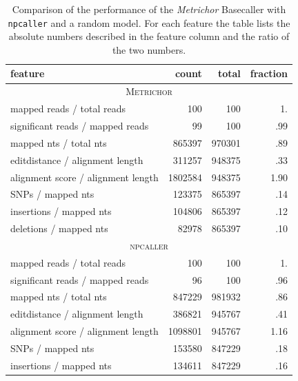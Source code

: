 \documentclass[]{scrartcl}
\begin{document}
\begin{table}[bp]
\centering
\caption{Comparison of the performance of the \textit{Metrichor} Basecaller with \texttt{npcaller} and a random model. For each feature the table lists the absolute numbers described in the feature column and the ratio of the two numbers. }
\label{tab:stats}
\small
\begin{tabular}{l|rrr}
\hline
\hline
\textbf{feature} & \textbf{count} & \textbf{total} & \textbf{fraction} \\\hline
\multicolumn{4}{c}{\textsc{Metrichor}}  \\
mapped reads / total reads 		&
100 	& 100 	& 1.	 \\

significant reads / mapped reads & 
99 & 100 & .99  \\

mapped nts / total nts &
865397 & 970301 & .89 \\

editdistance / alignment length & 
311257 & 948375 & .33  \\

alignment score / alignment length & 
1802584 & 948375 & 1.90  \\

SNPs / mapped nts & 
123375 & 865397 & .14  \\

insertions / mapped nts & 
104806 & 865397 & .12  \\

deletions / mapped nts & 
82978 & 865397 & .10  \\
\hline
 \multicolumn{4}{c}{\textsc{npcaller}} \\
mapped reads / total reads 		&
 100 	& 100 	& 1. \\

significant reads / mapped reads & 
96 & 100 & .96  \\

mapped nts / total nts &
847229 & 981932 & .86  \\

editdistance / alignment length & 
386821 & 945767 & .41  \\

alignment score / alignment length & 
1098801 & 945767 & 1.16  \\

SNPs / mapped nts & 
153580 & 847229 & .18  \\

insertions / mapped nts & 
134611 & 847229 & .16  \\


\end{tabular}
\end{table}
\end{document}
